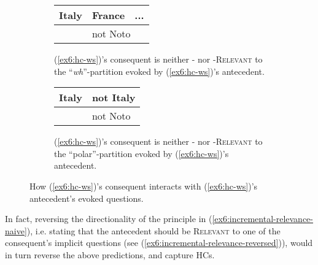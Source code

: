\begin{figure}[H]
	\centering
	\begin{subfigure}[t]{.47\linewidth}
		\centering
			\begin{tabular}{llll|}
				\hline
				\multicolumn{2}{|l|}{Italy} & \multicolumn{1}{l|}{France} & ... \\ \hline
				\multicolumn{1}{l|}{}   & \multicolumn{3}{l|}{\cellcolor{orange!20!white}not Noto}         \\ \cline{2-4} 
			\end{tabular}
		\caption[]{(\ref{ex6:hc-ws})'s consequent is neither \textsc{\citeauthor*{Lewis1988}-} nor \textsc{\citeauthor{Roberts2012}-Relevant} to the ``\textit{wh}''-partition evoked by (\ref{ex6:hc-ws})'s antecedent.}\label{tab:italy-not-noto-wh-rel}
	\end{subfigure}
	\hfill
	\begin{subfigure}[t]{.47\linewidth}
		\centering
		\begin{tabular}{llll|}
			\hline
			\multicolumn{2}{|l|}{Italy} & \multicolumn{2}{l|}{not Italy} \\ \hline
			\multicolumn{1}{l|}{}   & \multicolumn{3}{l|}{\cellcolor{orange!20!white}not Noto}      \\ \cline{2-4} 
		\end{tabular}
		\caption[]{(\ref{ex6:hc-ws})'s consequent is neither \textsc{\citeauthor*{Lewis1988}-} nor \textsc{\citeauthor{Roberts2012}-Relevant} to the ``polar''-partition evoked by (\ref{ex6:hc-ws})'s antecedent.}\label{tab:italy-not-noto-polar-rel}
	\end{subfigure}
	\caption[]{How (\ref{ex6:hc-ws})'s consequent interacts with (\ref{ex6:hc-ws})'s antecedent's evoked questions.}
\end{figure}

In fact, reversing the directionality of the principle in (\ref{ex6:incremental-relevance-naive}), i.e. stating that the antecedent should be \textsc{Relevant} to one of the consequent's implicit questions (see (\ref{ex6:incremental-relevance-reversed})), would in turn reverse the above predictions, and capture HCs. 


\begin{exe}
	\label{ex6:incremental-relevance-reversed}
\end{exe}


